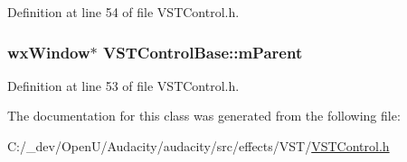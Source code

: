 Definition at line 54 of file V\+S\+T\+Control.\+h.

\subsubsection[{\texorpdfstring{m\+Parent}{mParent}}]{\setlength{\rightskip}{0pt plus 5cm}wx\+Window$\ast$ V\+S\+T\+Control\+Base\+::m\+Parent\hspace{0.3cm}{\ttfamily [protected]}}\hypertarget{class_v_s_t_control_base_a3e31638c55ccf87d12e5f46a284e74d8}{}\label{class_v_s_t_control_base_a3e31638c55ccf87d12e5f46a284e74d8}


Definition at line 53 of file V\+S\+T\+Control.\+h.



The documentation for this class was generated from the following file\+:\begin{DoxyCompactItemize}
\item 
C\+:/\+\_\+dev/\+Open\+U/\+Audacity/audacity/src/effects/\+V\+S\+T/\hyperlink{_v_s_t_control_8h}{V\+S\+T\+Control.\+h}\end{DoxyCompactItemize}
